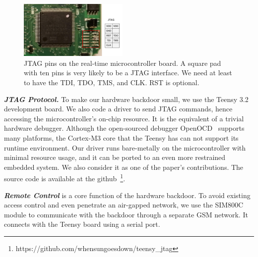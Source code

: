 \begin{figure}[th]
	\includegraphics[width=0.47\textwidth]{figures/board-jtag}
	\centering
	\caption{JTAG pins on the real-time microcontroller board. A square pad with ten pins is very likely to be a JTAG interface. We need at least to have the TDI, TDO, TMS, and CLK. RST is optional.}
	\label{fig:board-jtag}
\end{figure}



\textbf{\textit{JTAG Protocol.}} To make our hardware backdoor small, we use the Teensy 3.2 development board. We also code a driver to send JTAG commands, hence accessing the microcontroller's on-chip resource. It is the equivalent of a trivial hardware debugger. Although the open-sourced debugger OpenOCD~\cite{hogl2006open} supports many platforms, the Cortex-M3 core that the Teensy has can not support its runtime environment. Our driver runs bare-metally on the microcontroller with minimal resource usage, and it can be ported to an even more restrained embedded system.  We also consider it as one of the paper's contributions. The source code is available at the github~\footnote{https://github.com/whensungoesdown/teensy\_jtag}. 


\textbf{\textit{Remote Control}} is a core function of the hardware backdoor. To avoid existing access control and even penetrate an air-gapped network, we use the SIM800C module to communicate with the backdoor through a separate GSM network.  It connects with the Teensy board using a serial port.

